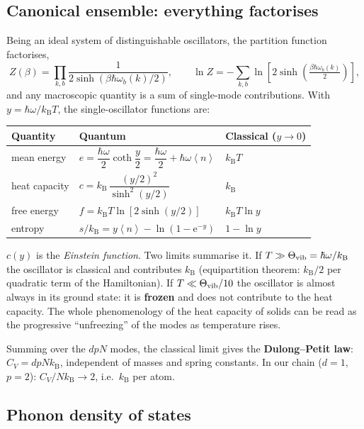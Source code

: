 \documentclass[11pt,a4paper]{article}
\newcommand{\kB}{k_{\mathrm B}}
\newcommand{\ee}{\mathrm{e}}
\newcommand{\avg}[1]{\left\langle #1\right\rangle}
\begin{document}
\subsection{Canonical ensemble: everything factorises}

Being an ideal system of distinguishable oscillators, the partition function
factorises,
\begin{equation}
Z(\beta)=\prod_{k,b}\frac{1}{2\sinh\!\left(\beta\hbar\omega_b(k)/2\right)},
\qquad
\ln Z=-\sum_{k,b}\ln\!\left[2\sinh\!\left(\tfrac{\beta\hbar\omega_b(k)}{2}\right)\right],
\end{equation}
and any macroscopic quantity is a sum of single-mode contributions. With
$y=\hbar\omega/\kB T$, the single-oscillator functions are:

\begin{center}
\small
\begin{tabular}{@{}lll@{}}
\toprule
Quantity & Quantum & Classical ($y\to0$)\\
\midrule
mean energy & $e=\dfrac{\hbar\omega}{2}\coth\dfrac y2=\dfrac{\hbar\omega}{2}+\hbar\omega\avg{n}$ & $\kB T$\\[6pt]
heat capacity & $c=\kB\,\dfrac{(y/2)^2}{\sinh^2(y/2)}$ & $\kB$\\[6pt]
free energy & $f=\kB T\ln\!\left[2\sinh(y/2)\right]$ & $\kB T\ln y$\\[4pt]
entropy & $s/\kB=y\avg{n}-\ln(1-\ee^{-y})$ & $1-\ln y$\\
\bottomrule
\end{tabular}
\end{center}

\noindent $c(y)$ is the \emph{Einstein function}. Two limits summarise it. If
$T\gg\Theta_{\rm vib}=\hbar\omega/\kB$ the oscillator is classical and
contributes $\kB$ (equipartition theorem: $\kB/2$ per quadratic term of the
Hamiltonian). If $T\ll\Theta_{\rm vib}/10$ the oscillator is almost always in
its ground state: it is \textbf{frozen} and does not contribute to the heat
capacity. The whole phenomenology of the heat capacity of solids can be read as
the progressive ``unfreezing'' of the modes as temperature rises.

Summing over the $dpN$ modes, the classical limit gives the \textbf{Dulong–Petit
law}: $C_V=dpN\kB$, independent of masses and spring constants. In our chain
($d=1$, $p=2$): $C_V/N\kB\to2$, i.e.\ $\kB$ per atom.

\subsection{Phonon density of states}
\end{document}
